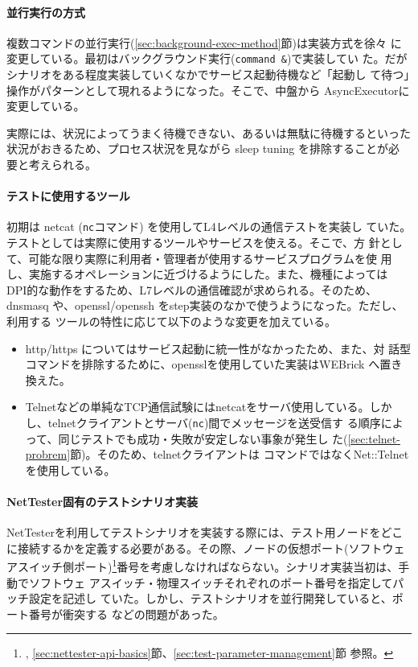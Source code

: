     \paragraph{並行実行の方式}

複数コマンドの並行実行(\ref{sec:background-exec-method}節)は実装方式を徐々
に変更している。最初はバックグラウンド実行(\verb|command &|)で実装してい
た。だがシナリオをある程度実装していくなかでサービス起動待機など「起動し
て待つ」操作がパターンとして現れるようになった。そこで、中盤から
AsyncExecutorに変更している。

実際には、状況によってうまく待機できない、あるいは無駄に待機するといった
状況がおきるため、プロセス状況を見ながら sleep tuning を排除することが必
要と考えられる。

    \paragraph{テストに使用するツール}

初期は netcat (\verb|nc|コマンド) を使用してL4レベルの通信テストを実装し
ていた。テストとしては実際に使用するツールやサービスを使える。そこで、方
針として、可能な限り実際に利用者・管理者が使用するサービスプログラムを使
用し、実施するオペレーションに近づけるようにした。また、機種によっては
DPI的な動作をするため、L7レベルの通信確認が求められる。そのため、dnsmasq
や、openssl/openssh をstep実装のなかで使うようになった。ただし、利用する
ツールの特性に応じて以下のような変更を加えている。
\begin{itemize}
 \item http/https についてはサービス起動に統一性がなかったため、また、対
       話型コマンドを排除するために、opensslを使用していた実装はWEBrick
       へ置き換えた。
 \item Telnetなどの単純なTCP通信試験にはnetcatをサーバ使用している。しか
       し、telnetクライアントとサーバ(\verb|nc|)間でメッセージを送受信す
       る順序によって、同じテストでも成功・失敗が安定しない事象が発生し
       た(\ref{sec:telnet-probrem}節)。そのため、telnetクライアントは
       コマンドではなくNet::Telnetを使用している。
\end{itemize}

\paragraph{NetTester固有のテストシナリオ実装}
NetTesterを利用してテストシナリオを実装する際には、テスト用ノードをどこ
に接続するかを定義する必要がある。その際、ノードの仮想ポート(ソフトウェ
アスイッチ側ポート)\footnote{,
\ref{sec:nettester-api-basics}節、\ref{sec:test-parameter-management}節
参照。}番号を考慮しなければならない。シナリオ実装当初は、手動でソフトウェ
アスイッチ・物理スイッチそれぞれのポート番号を指定してパッチ設定を記述し
ていた。しかし、テストシナリオを並行開発していると、ポート番号が衝突する
などの問題があった。

